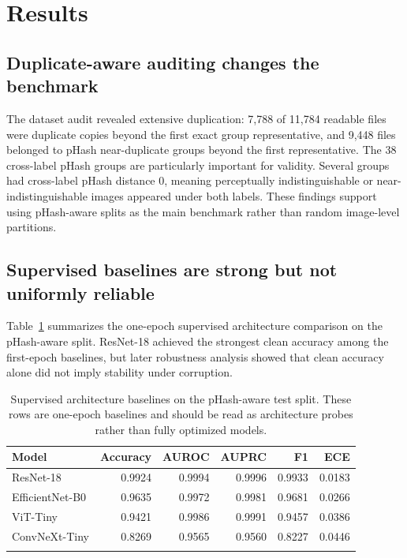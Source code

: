\documentclass[pdflatex,sn-mathphys-num]{sn-jnl}
\theoremstyle{thmstyleone}
\theoremstyle{thmstyletwo}
\theoremstyle{thmstylethree}
\begin{document}
\section{Results}\label{sec:results}

\subsection{Duplicate-aware auditing changes the benchmark}\label{subsec:audit_results}

The dataset audit revealed extensive duplication: 7,788 of 11,784 readable files were duplicate copies beyond the first exact group representative, and 9,448 files belonged to pHash near-duplicate groups beyond the first representative. The 38 cross-label pHash groups are particularly important for validity. Several groups had cross-label pHash distance 0, meaning perceptually indistinguishable or near-indistinguishable images appeared under both labels. These findings support using pHash-aware splits as the main benchmark rather than random image-level partitions.

\subsection{Supervised baselines are strong but not uniformly reliable}\label{subsec:baseline_results}

Table~\ref{tab:baselines} summarizes the one-epoch supervised architecture comparison on the pHash-aware split. ResNet-18 achieved the strongest clean accuracy among the first-epoch baselines, but later robustness analysis showed that clean accuracy alone did not imply stability under corruption.

\begin{table}[h]
\caption{Supervised architecture baselines on the pHash-aware test split. These rows are one-epoch baselines and should be read as architecture probes rather than fully optimized models.}\label{tab:baselines}
\begin{tabular}{@{}lrrrrr@{}}
\toprule
Model & Accuracy & AUROC & AUPRC & F1 & ECE \\
\midrule
ResNet-18 & 0.9924 & 0.9994 & 0.9996 & 0.9933 & 0.0183 \\
EfficientNet-B0 & 0.9635 & 0.9972 & 0.9981 & 0.9681 & 0.0266 \\
ViT-Tiny & 0.9421 & 0.9986 & 0.9991 & 0.9457 & 0.0386 \\
ConvNeXt-Tiny & 0.8269 & 0.9565 & 0.9560 & 0.8227 & 0.0446 \\
\botrule
\end{tabular}
\end{table}
\end{document}
